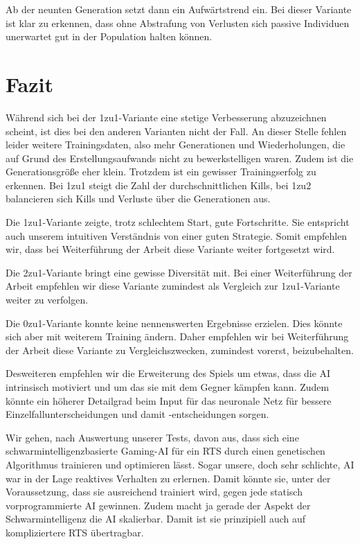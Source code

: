 \documentclass[
	12pt,
	a4paper,
	BCOR10mm,
	DIV14,
	headsepline,
	usegeometry,
]{scrreprt}
\begin{document}
Ab der neunten Generation setzt dann ein Aufwärtstrend ein.
Bei dieser Variante ist klar zu erkennen, dass ohne Abstrafung von Verlusten sich passive Individuen unerwartet gut in der Population halten können.

\section{Fazit}
Während sich bei der 1zu1-Variante eine stetige Verbesserung abzuzeichnen scheint, ist dies bei den anderen Varianten nicht der Fall.
An dieser Stelle fehlen leider weitere Trainingsdaten, also mehr Generationen und Wiederholungen, die auf Grund des Erstellungsaufwands nicht zu bewerkstelligen waren.
Zudem ist die Generationsgröße eher klein.
Trotzdem ist ein gewisser Trainingserfolg zu erkennen.
Bei 1zu1 steigt die Zahl der durchschnittlichen Kills, bei 1zu2 balancieren sich Kills und Verluste über die Generationen aus.

Die 1zu1-Variante zeigte, trotz schlechtem Start, gute Fortschritte.
Sie entspricht auch unserem intuitiven Verständnis von einer guten Strategie.
Somit empfehlen wir, dass bei Weiterführung der Arbeit diese Variante weiter fortgesetzt wird.

Die 2zu1-Variante bringt eine gewisse Diversität mit.
Bei einer Weiterführung der Arbeit empfehlen wir diese Variante zumindest als Vergleich zur 1zu1-Variante weiter zu verfolgen.

Die 0zu1-Variante konnte keine nennenswerten Ergebnisse erzielen.
Dies könnte sich aber mit weiterem Training ändern.
Daher empfehlen wir bei Weiterführung der Arbeit diese Variante zu Vergleichszwecken, zumindest vorerst, beizubehalten.

Desweiteren empfehlen wir die Erweiterung des Spiels um etwas, dass die AI intrinsisch motiviert und um das sie mit dem Gegner kämpfen kann.
Zudem könnte ein höherer Detailgrad beim Input für das neuronale Netz für bessere Einzelfallunterscheidungen und damit -entscheidungen sorgen.

Wir gehen, nach Auswertung unserer Tests, davon aus, dass sich eine schwarmintelligenzbasierte Gaming-AI für ein RTS durch einen genetischen Algorithmus trainieren und optimieren lässt.
Sogar unsere, doch sehr schlichte, AI war in der Lage reaktives Verhalten zu erlernen.
Damit könnte sie, unter der Voraussetzung, dass sie ausreichend trainiert wird, gegen jede statisch vorprogrammierte AI gewinnen.
Zudem macht ja gerade der Aspekt der Schwarmintelligenz die AI skalierbar.
Damit ist sie prinzipiell auch auf kompliziertere RTS übertragbar.
\end{document}
